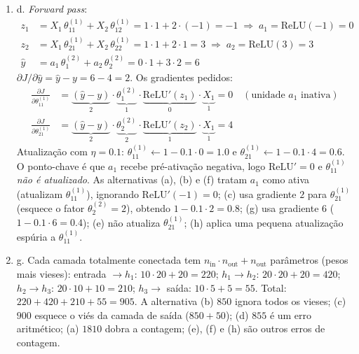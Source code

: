 \documentclass{dlproblemset}
\begin{document}
\begin{enumerate}[1)]
    \item d. \textit{Forward pass}:
    \begin{align*}
        z_1 &= X_1\,\theta^{(1)}_{11} + X_2\,\theta^{(1)}_{12} = 1\cdot 1 + 2\cdot(-1) = -1 \;\Rightarrow\; a_1 = \mathrm{ReLU}(-1) = 0 \\
        z_2 &= X_1\,\theta^{(1)}_{21} + X_2\,\theta^{(1)}_{22} = 1\cdot 1 + 2\cdot 1 = 3 \;\Rightarrow\; a_2 = \mathrm{ReLU}(3) = 3 \\
        \hat{y} &= a_1\,\theta^{(2)}_{1} + a_2\,\theta^{(2)}_{2} = 0\cdot 1 + 3\cdot 2 = 6
    \end{align*}
    $\partial J/\partial \hat{y} = \hat{y} - y = 6 - 4 = 2$. Os gradientes pedidos:
    \begin{align*}
        \frac{\partial J}{\partial \theta^{(1)}_{11}} &= \underbrace{(\hat{y}-y)}_{2}\cdot \underbrace{\theta^{(2)}_{1}}_{1}\cdot \underbrace{\mathrm{ReLU}'(z_1)}_{0}\cdot \underbrace{X_1}_{1} = 0 \quad (\text{unidade } a_1 \text{ inativa}) \\
        \frac{\partial J}{\partial \theta^{(1)}_{21}} &= \underbrace{(\hat{y}-y)}_{2}\cdot \underbrace{\theta^{(2)}_{2}}_{2}\cdot \underbrace{\mathrm{ReLU}'(z_2)}_{1}\cdot \underbrace{X_1}_{1} = 4
    \end{align*}
    Atualização com $\eta = 0.1$: $\theta^{(1)}_{11} \leftarrow 1 - 0.1\cdot 0 = 1.0$ e $\theta^{(1)}_{21} \leftarrow 1 - 0.1\cdot 4 = 0.6$. O ponto-chave é que $a_1$ recebe pré-ativação negativa, logo $\mathrm{ReLU}' = 0$ e $\theta^{(1)}_{11}$ \emph{não é atualizado}. As alternativas (a), (b) e (f) tratam $a_1$ como ativa (atualizam $\theta^{(1)}_{11}$), ignorando $\mathrm{ReLU}'(-1) = 0$; (c) usa gradiente $2$ para $\theta^{(1)}_{21}$ (esquece o fator $\theta^{(2)}_2 = 2$), obtendo $1 - 0.1\cdot 2 = 0.8$; (g) usa gradiente $6$ ($1 - 0.1\cdot 6 = 0.4$); (e) não atualiza $\theta^{(1)}_{21}$; (h) aplica uma pequena atualização espúria a $\theta^{(1)}_{11}$.

    \item g. Cada camada totalmente conectada tem $n_{\text{in}}\cdot n_{\text{out}} + n_{\text{out}}$ parâmetros (pesos mais vieses): entrada $\to h_1$: $10\cdot 20 + 20 = 220$; $h_1 \to h_2$: $20\cdot 20 + 20 = 420$; $h_2 \to h_3$: $20\cdot 10 + 10 = 210$; $h_3 \to$ saída: $10\cdot 5 + 5 = 55$. Total: $220 + 420 + 210 + 55 = 905$. A alternativa (b) $850$ ignora todos os vieses; (c) $900$ esquece o viés da camada de saída ($850 + 50$); (d) $855$ é um erro aritmético; (a) $1810$ dobra a contagem; (e), (f) e (h) são outros erros de contagem.


\end{enumerate}
\end{document}
